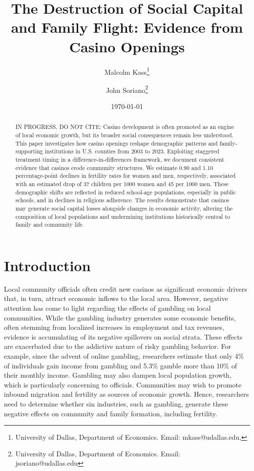 \documentclass[12pt]{article}
\title{The Destruction of Social Capital and Family Flight: Evidence from Casino Openings}
\author{Malcolm Kass\thanks{University of Dallas, Department of Economics. Email: mkass@udallas.edu,} \and John Soriano\thanks{University of Dallas, Department of Economics. Email: jsoriano@udallas.edu}}
\date{\today}
\begin{document}
\maketitle

\begin{abstract}
IN PROGRESS, DO NOT CITE: Casino development is often promoted as an engine of local economic growth, but its broader social consequences remain less understood. This paper investigates how casino openings reshape demographic patterns and family-supporting institutions in U.S. counties from 2003 to 2023. Exploiting staggered treatment timing in a difference-in-differences framework, we document consistent evidence that casinos erode community structures. We estimate 0.90 and 1.10 percentage-point declines in fertility rates for women and men, respectively, associated with an estimated drop of 37 children per 1000 women and 45 per 1000 men. These demographic shifts are reflected in reduced school-age populations, especially in public schools, and in declines in religious adherence. The results demonstrate that casinos may generate social capital losses alongside changes in economic activity, altering the composition of local populations and undermining institutions historically central to family and community life.   
\end{abstract}

\newpage

\section{Introduction}

\doublespacing

Local community officials often credit new casinos as significant economic drivers that, in turn, attract economic inflows to the local area. \parencite{keranews2025irvingcasino} However, negative attention has come to light regarding the effects of gambling on local communities. While the gambling industry generates some economic benefits, often stemming from localized increases in employment and tax revenues, evidence is accumulating of its negative spillovers on social strata. These effects are exacerbated due to the addictive nature of risky gambling behavior. For example, since the advent of online gambling, researchers estimate that only 4\% of individuals gain income from gambling and 5.3\% gamble more than 10\% of their monthly income. \parencite{Clark2024LegalizedGambling}  Gambling may also dampen local population growth, which is particularly concerning to officials. Communities may wish to promote inbound migration and fertility as sources of economic growth. Hence, researchers need to determine whether sin industries, such as gambling, generate these negative effects on community and family formation, including fertility. 
\end{document}

